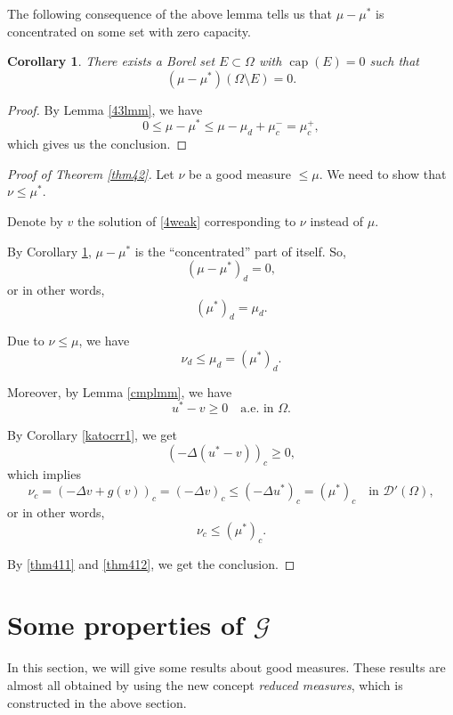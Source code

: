 \documentclass[a4paper, 11pt]{report}
\newtheorem{crr}{Corollary}[chapter]
\theoremstyle{definition}\newtheorem*{rmk}{Remark}
\DeclareMathOperator{\capa}{cap}
\begin{document}
The following consequence of the above lemma tells us that $\mu - \mu^*$ is concentrated on some set with zero capacity.

\begin{crr}\label{43crr}
There exists a Borel set $E \subset \Omega$ with $\capa(E) = 0$ such that
\[
(\mu - \mu^*)(\Omega \setminus E) = 0.
\]
\end{crr}

\begin{proof}
By Lemma \ref{43lmm}, we have
\[
0 \le \mu -\mu^* \le \mu - \mu_d + \mu_c^- = \mu_c^+,
\]
which gives us the conclusion.
\end{proof}

\begin{proof}[Proof of Theorem \ref{thm42}]
Let $\nu$ be a good measure $\le \mu$. We need to show that $\nu \le \mu^*$.

Denote by $v$ the solution of \eqref{4weak} corresponding to $\nu$ instead of $\mu$.

By Corollary \ref{43crr}, $\mu - \mu^*$ is the ``concentrated'' part of itself. So,
\[
(\mu - \mu^*)_d = 0,
\]
or in other words,
\[
(\mu^*)_d = \mu_d.
\]

Due to $\nu \le \mu$, we have
\begin{equation}\label{thm411}
\nu_d \le \mu_d = (\mu^*)_d.
\end{equation}

Moreover, by Lemma \ref{cmplmm}, we have
\[
u^* - v \ge 0 \quad\text{a.e.\ in }\Omega.
\]

By Corollary \ref{katocrr1}, we get
\[
(-\Delta (u^* -v))_c \ge 0,
\]
which implies
\[
\nu_c = (-\Delta v + g(v))_c = (-\Delta v)_c \le (-\Delta u^*)_c = (\mu^*)_c \quad\text{in }\mathcal{D}'(\Omega),
\]
or in other words,
\begin{equation}\label{thm412}
\nu_c \le (\mu^*)_c.
\end{equation}

By \eqref{thm411} and \eqref{thm412}, we get the conclusion.
\end{proof}

\section{\texorpdfstring{Some properties of $\mathcal{G}$}{Some properties of G}}
\mbox{}

In this section, we will give some results about good measures. These results are almost all obtained by using the new concept \emph{reduced measures}, which is constructed in the above section.
\end{document}
